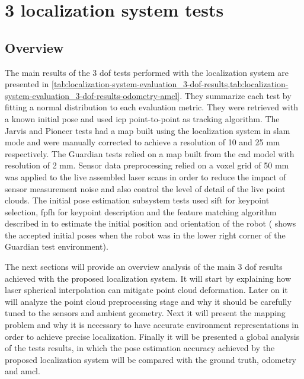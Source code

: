 \section{3  localization system tests}\label{sec:planar-localization-system-tests}


\subsection{Overview}

The main results of the 3 \gls{dof} tests performed with the localization system are presented in \cref{tab:localization-system-evaluation_3-dof-results,tab:localization-system-evaluation_3-dof-results-odometry-amcl}. They summarize each test by fitting a normal distribution to each evaluation metric. They were retrieved with a known initial pose and used \gls{icp} point-to-point as tracking algorithm. The Jarvis and Pioneer tests had a map built using the localization system in \gls{slam} mode and were manually corrected to achieve a resolution of 10 and 25 mm respectively. The Guardian tests relied on a map built from the \gls{cad} model with resolution of 2 mm. Sensor data preprocessing relied on a voxel grid of 50 mm was applied to the live assembled laser scans in order to reduce the impact of sensor measurement noise and also control the level of detail of the live point clouds. The initial pose estimation subsystem tests used \gls{sift} for keypoint selection, \gls{fpfh} for keypoint description and the feature matching algorithm described in  to estimate the initial position and orientation of the robot ( shows the accepted initial poses when the robot was in the lower right corner of the Guardian test environment).

The next sections will provide an overview analysis of the main 3 \gls{dof} results achieved with the proposed localization system. It will start by explaining how laser spherical interpolation can mitigate point cloud deformation. Later on it will analyze the point cloud preprocessing stage and why it should be carefully tuned to the sensors and ambient geometry. Next it will present the mapping problem and why it is necessary to have accurate environment representations in order to achieve precise localization. Finally it will be presented a global analysis of the tests results, in which the pose estimation accuracy achieved by the proposed localization system will be compared with the ground truth, odometry and \gls{amcl}.


